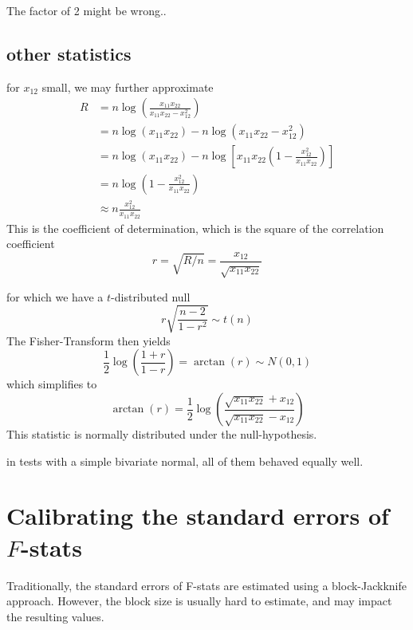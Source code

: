 \documentclass[12pt, letterpaper]{article}
\begin{document}
The factor of 2 might be wrong..

\subsection{other statistics}
for $x_{12}$  small, we may further approximate
\begin{align}
         R &= n  \log \left( \frac{x_{11}x_{22}}{x_{11}x_{22} - x_{12}^2}  \right)\nonumber\\
            &= n  \log ( x_{11}x_{22}) - n\log ({x_{11}x_{22} - x_{12}^2} )\nonumber\\
            &= n  \log ( x_{11}x_{22}) - n\log \left[x_{11}x_{22} \left(1  - \frac{x_{12}^2}{x_{11}x_{22}} \right)\right]\nonumber\\
           &=n  \log \left( 1 - \frac{x_{12}^2}{x_{11}x_{22}}  \right) \nonumber\\
           &\approx  n \frac{x_{12}^2}{x_{11}x_{22}} 
\end{align}
This is the coefficient of determination, which is the square of the correlation coefficient
\begin{equation}
    r =  \sqrt{R/n} = \frac{x_{12}}{\sqrt{x_{11}x_{22}}}
\end{equation}

for which we have a $t$-distributed null
\begin{equation}
    r \sqrt{\frac{n-2}{1-r^2}} \sim t(n)
\end{equation}
The Fisher-Transform then yields
\begin{equation}
    \frac{1}{2} \log\left(\frac{1+r}{1-r}\right) = \arctan(r) \sim N(0,1)
\end{equation}
which simplifies to 
\begin{equation}
    \arctan(r) = \frac{1}{2} \log\left(\frac{\sqrt{x_{11}x_{22}} + x_{12}}{\sqrt{x_{11}x_{22}} - x_{12}}\right) 
\end{equation}
This statistic is normally distributed under the null-hypothesis.


in tests with a simple bivariate normal, all of them behaved equally well.


\newpage
\section{Calibrating the standard errors of $F$-stats}
Traditionally, the standard errors of F-stats are estimated using a block-Jackknife approach. However, the block size is usually hard to estimate, and may impact the resulting values.
\end{document}

